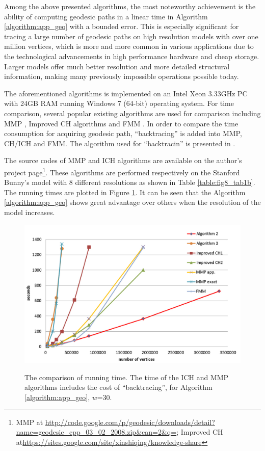 Among the above presented algorithms, the most noteworthy achievement is the ability of computing geodesic paths in a linear time in Algorithm \ref{algorithm:app_geo} with a bounded error. This is especially significant for tracing a large number of geodesic paths on high resolution models with over one million vertices, which is more and more common in various applications due to the technological advancements in high performance hardware and cheap storage. Larger models offer much better resolution and more detailed structural information, making many previously impossible operations possible today.

The aforementioned algorithms is implemented on an Intel Xeon 3.33GHz PC with 24GB RAM running Windows 7 (64-bit) operating system. For time comparison, several popular existing algorithms are used for comparison including MMP , Improved CH algorithms  and FMM . In order to compare the time consumption for acquiring geodesic path, ``backtracing'' is added into MMP, CH/ICH and FMM. The algorithm used for ``backtracin'' is presented in \cite{Surazhsky:2005}.

The source codes of MMP and ICH algorithms are available on the author's project page\footnote{MMP at \url{http://code.google.com/p/geodesic/downloads/detail?name=geodesic_cpp_03_02_2008.zip&can=2&q=}; Improved CH at\url{https://sites.google.com/site/xinshiqing/knowledge-share}}. These algorithms are performed respectively on the Stanford Bunny's model with 8 different resolutions as shown in Table \ref{table:fig8_tab1b}. The running times are plotted in Figure \ref{figure:fig8_tab1a}. It can be seen that the Algorithm \ref{algorithm:app_geo} shows great advantage over others when the resolution of the model increases. 

\begin{figure}[H]
	\includegraphics[width=1\columnwidth]{../images/geodesic_image/Picture1-1}\\
    \caption[Running time comparison for geodesic algorithms]{The comparison of running time. The time of the ICH and MMP algorithms includes the cost of ``backtracing'', for Algorithm \ref{algorithm:app_geo}, $w$=30.}
    \label{figure:fig8_tab1a}
\end{figure}

